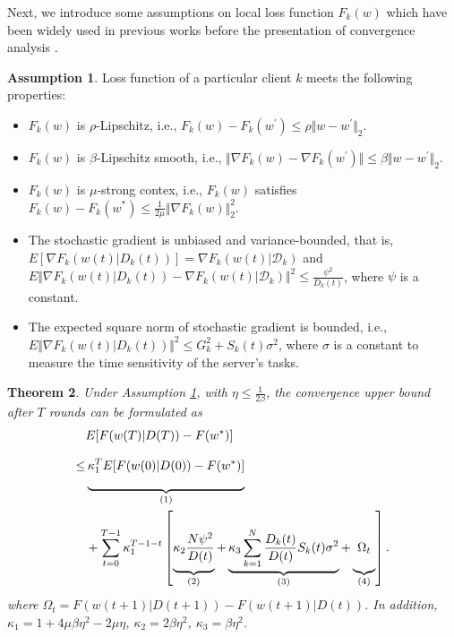 \documentclass{article}
\theoremstyle{plain}
\newtheorem{theorem}{Theorem}[section]
\theoremstyle{definition}
\newtheorem{assumption}[theorem]{Assumption}
\theoremstyle{remark}
\begin{document}
Next, we introduce some assumptions on local loss function $F_k(w)$ which have been widely used in previous works before the presentation of convergence analysis \cite{wu2023towards} \cite{wei2020federated}.
\begin{assumption}
  Loss function of a particular client $k$ meets the following properties:
  \begin{itemize}
    \item $F_k(w)$ is $\rho$-Lipschitz, i.e., $F_k(w) - F_k(w^{'}) \leq \rho \Vert w - w^{'} \Vert_2$.
    \item $F_k(w)$ is $\beta$-Lipschitz smooth, i.e., $\Vert\nabla F_k(w) - \nabla F_k(w^{'})\Vert \leq \beta \Vert w-w^{'} \Vert_2$.
    \item $F_k(w)$ is $\mu$-strong contex, i.e., $F_k(w)$ satisfies $F_k(w) - F_k(w^*) \leq \frac{1}{2\mu}\Vert\nabla F_k(w)\Vert_2^2$.
    \item The stochastic gradient is unbiased and variance-bounded, that is, $E[\nabla F_k(w(t)|D_k(t))] = \nabla F_k(w(t)|\mathcal{D}_k)$ and $E\Vert\nabla F_k(w(t)|D_k(t)) - \nabla F_k(w(t)|\mathcal{D}_k)\Vert^2 \leq \frac{\psi^2}{D_k(t)}$, where $\psi$ is a constant.
    \item The expected square norm of stochastic gradient is bounded, i.e., $E\Vert \nabla F_k(w(t)|D_k(t))\Vert^2 \leq G_k^2 + S_k(t)\sigma^2$, where $\sigma$ is a constant to measure the time sensitivity of the server's tasks.
  \end{itemize}
  \label{assumption}
\end{assumption}
\begin{theorem}
  \label{theorem:upperbound}
  Under Assumption \ref{assumption}, with $\eta \leq \frac{1}{2\beta}$, the convergence upper bound after $T$ rounds can be formulated as
    \begin{align}
      & E[F(w(T)|D(T)) - F(w^*)] \notag \\
      \leq & \underbrace{\vphantom{\sum_{min}^{max}\frac{1}{2}} \kappa_1^{T} E[F(w(0)|D(0))-F(w^*)]}_{(1)} \notag \\
      & + \sum_{t=0}^{T-1} \kappa_1^{T-1-t} \left[\underbrace{\vphantom{\sum_{min}^{max}\frac{1}{2}} \kappa_2 \frac{N\psi^2}{D(t)}}_{(2)} + \underbrace{\vphantom{\sum_{min}^{max}\frac{1}{2}} \kappa_3 \sum_{k=1}^{N} \frac{D_k(t)}{D(t)} S_k(t) \sigma^2}_{(3)} + \underbrace{\vphantom{\sum_{min}^{max}\frac{1}{2}} \Omega_{t}}_{(4)}\right]. \notag \\ 
    \end{align}
  where $\Omega_t = F(w(t+1)|D(t+1)) - F(w(t+1)|D(t))$.
  In addition, $\kappa_1 = 1 + 4\mu\beta\eta^2 - 2\mu\eta$, $\kappa_2 = 2\beta\eta^2$, $\kappa_3 = \beta\eta^2$. 
\end{theorem}
\end{document}
